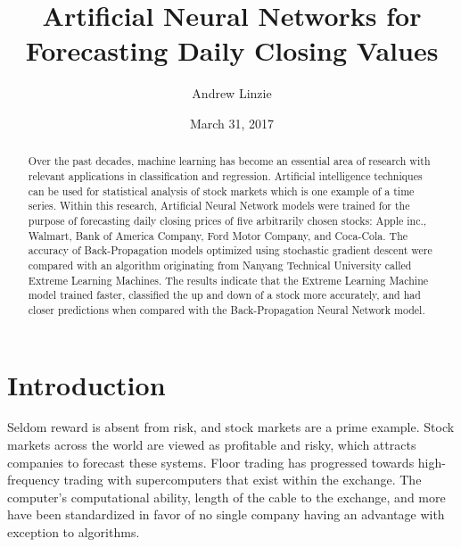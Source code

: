 \documentclass{ncjms}
\begin{document}
    \title{Artificial Neural Networks for Forecasting Daily Closing Values}
	\author[A. Linzie]{Andrew Linzie}
	\address[A. Linzie]{Department of Mathematical Sciences, P.O. Box 7261, Boiling Springs, NC 28017}
	\date{March 31, 2017}

    \begin{abstract}
		Over the past decades, machine learning has become an essential area of research with relevant applications in classification and regression.
		Artificial intelligence techniques can be used for statistical analysis of stock markets which is one example of a time series.
		Within this research, Artificial Neural Network models were trained for the purpose of forecasting daily closing prices of five arbitrarily chosen stocks: Apple inc., Walmart, Bank of America Company, Ford Motor Company, and Coca-Cola.
		The accuracy of Back-Propagation models optimized using stochastic gradient descent were compared with an algorithm originating from Nanyang Technical University called Extreme Learning Machines.
		The results indicate that the Extreme Learning Machine model trained faster, classified the up and down of a stock more accurately, and had closer predictions when compared with the Back-Propagation Neural Network model.
	\end{abstract}

    \maketitle

	\section{Introduction}\label{sec:introduction}
	Seldom reward is absent from risk, and stock markets are a prime example.
	Stock markets across the world are viewed as profitable and risky, which attracts companies to forecast these systems.
	Floor trading has progressed towards high-frequency trading with supercomputers that exist within the exchange.
	The computer's computational ability, length of the cable to the exchange, and more have been standardized in favor of no single company having an advantage with exception to algorithms.
\end{document}
